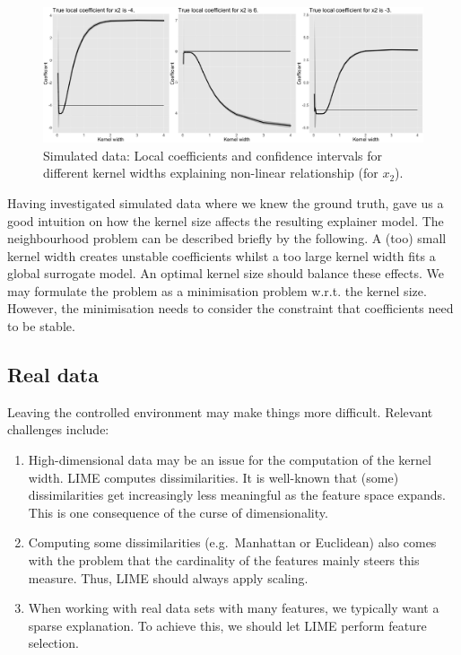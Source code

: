 \documentclass[
]{krantz}
\begin{document}
\begin{figure}

{\centering \includegraphics[width=0.99\linewidth]{images/04-09-13} 

}

\caption{Simulated data: Local coefficients and confidence intervals for different kernel widths explaining non-linear relationship (for $x_2$).}\label{fig:lime-fig13}
\end{figure}

Having investigated simulated data where we knew the ground truth, gave us a good intuition on how the kernel size affects the resulting explainer model.
The neighbourhood problem can be described briefly by the following.
A (too) small kernel width creates unstable coefficients whilst a too large kernel width fits a global surrogate model.
An optimal kernel size should balance these effects.
We may formulate the problem as a minimisation problem w.r.t. the kernel size.
However, the minimisation needs to consider the constraint that coefficients need to be stable.

\hypertarget{id42}{%
\subsection{Real data}\label{id42}}

Leaving the controlled environment may make things more difficult.
Relevant challenges include:

\begin{enumerate}
\def\labelenumi{\arabic{enumi}.}
\item
  High-dimensional data may be an issue for the computation of the kernel width.
  LIME computes dissimilarities.
  It is well-known that (some) dissimilarities get increasingly less meaningful as the feature space expands.
  This is one consequence of the curse of dimensionality.
\item
  Computing some dissimilarities (e.g.~Manhattan or Euclidean) also comes with the problem that the cardinality of the features mainly steers this measure.
  Thus, LIME should always apply scaling.
\item
  When working with real data sets with many features, we typically want a sparse explanation.
  To achieve this, we should let LIME perform feature selection.
\end{enumerate}
\end{document}
